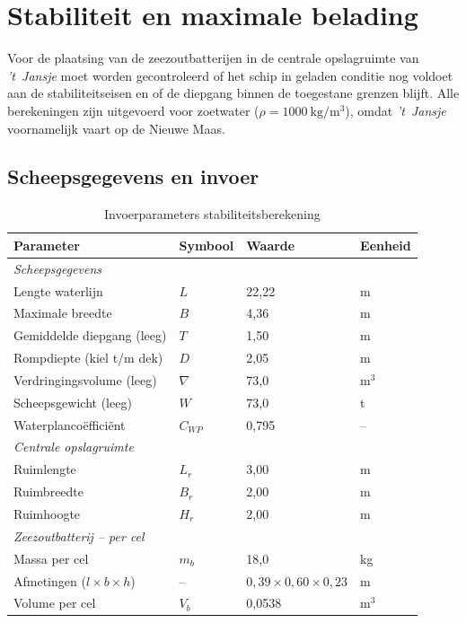 \chapter{Stabiliteit en maximale belading}
\label{chap:stabiliteit}

Voor de plaatsing van de zeezoutbatterijen in de centrale opslagruimte van
\emph{'t~Jansje} moet worden gecontroleerd of het schip in geladen conditie
nog voldoet aan de stabiliteitseisen en of de diepgang binnen de toegestane
grenzen blijft. Alle berekeningen zijn uitgevoerd voor zoetwater
($\rho = 1000\ \mathrm{kg/m^3}$), omdat \emph{'t~Jansje} voornamelijk vaart
op de Nieuwe Maas.

\section{Scheepsgegevens en invoer}
\label{sec:stab_geometrie}

\begin{table}[H]
\centering
\caption{Invoerparameters stabiliteitsberekening}
\label{tab:stab_input}
\begin{tabular}{llll}
\toprule
Parameter & Symbool & Waarde & Eenheid \\
\midrule
\multicolumn{4}{l}{\textit{Scheepsgegevens}} \\
\midrule
Lengte waterlijn            & $L$      & 22{,}22 & m     \\
Maximale breedte            & $B$      &  4{,}36 & m     \\
Gemiddelde diepgang (leeg)  & $T$      &  1{,}50 & m     \\
Rompdiepte (kiel t/m dek)   & $D$      &  2{,}05 & m     \\
Verdringingsvolume (leeg)   & $\nabla$ & 73{,}0  & m$^3$ \\
Scheepsgewicht (leeg)       & $W$      & 73{,}0  & t     \\
Waterplancoëfficiënt        & $C_{WP}$ &  0{,}795& --    \\
\midrule
\multicolumn{4}{l}{\textit{Centrale opslagruimte}} \\
\midrule
Ruimlengte                  & $L_r$    &  3{,}00 & m     \\
Ruimbreedte                 & $B_r$    &  2{,}00 & m     \\
Ruimhoogte                  & $H_r$    &  2{,}00 & m     \\
\midrule
\multicolumn{4}{l}{\textit{Zeezoutbatterij -- per cel \cite{DrTenInfo2025}}} \\
\midrule
Massa per cel               & $m_b$    & 18{,}0  & kg    \\
Afmetingen ($l \times b \times h$) & -- & $0{,}39 \times 0{,}60 \times 0{,}23$ & m \\
Volume per cel              & $V_b$    & 0{,}0538& m$^3$ \\
\bottomrule
\end{tabular}
\end{table}

